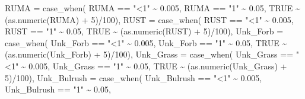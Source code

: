 \documentclass[
]{book}
\newenvironment{Shaded}{\begin{snugshade}}{\end{snugshade}}
\newcommand{\AttributeTok}[1]{\textcolor[rgb]{0.77,0.63,0.00}{#1}}
\newcommand{\ConstantTok}[1]{\textcolor[rgb]{0.00,0.00,0.00}{#1}}
\newcommand{\DecValTok}[1]{\textcolor[rgb]{0.00,0.00,0.81}{#1}}
\newcommand{\FloatTok}[1]{\textcolor[rgb]{0.00,0.00,0.81}{#1}}
\newcommand{\FunctionTok}[1]{\textcolor[rgb]{0.00,0.00,0.00}{#1}}
\newcommand{\NormalTok}[1]{#1}
\newcommand{\SpecialCharTok}[1]{\textcolor[rgb]{0.00,0.00,0.00}{#1}}
\newcommand{\StringTok}[1]{\textcolor[rgb]{0.31,0.60,0.02}{#1}}
\begin{document}
\begin{Shaded}
\begin{Highlighting}[]
        \AttributeTok{RUMA =} \FunctionTok{case\_when}\NormalTok{(}
\NormalTok{          RUMA }\SpecialCharTok{==} \StringTok{"\textless{}1"} \SpecialCharTok{\textasciitilde{}} \FloatTok{0.005}\NormalTok{, }
\NormalTok{          RUMA }\SpecialCharTok{==} \StringTok{"1"} \SpecialCharTok{\textasciitilde{}} \FloatTok{0.05}\NormalTok{, }
          \ConstantTok{TRUE} \SpecialCharTok{\textasciitilde{}}\NormalTok{ (}\FunctionTok{as.numeric}\NormalTok{(RUMA) }\SpecialCharTok{+} \DecValTok{5}\NormalTok{)}\SpecialCharTok{/}\DecValTok{100}\NormalTok{),}
        \AttributeTok{RUST =} \FunctionTok{case\_when}\NormalTok{(}
\NormalTok{          RUST }\SpecialCharTok{==} \StringTok{"\textless{}1"} \SpecialCharTok{\textasciitilde{}} \FloatTok{0.005}\NormalTok{, }
\NormalTok{          RUST }\SpecialCharTok{==} \StringTok{"1"} \SpecialCharTok{\textasciitilde{}} \FloatTok{0.05}\NormalTok{, }
          \ConstantTok{TRUE} \SpecialCharTok{\textasciitilde{}}\NormalTok{ (}\FunctionTok{as.numeric}\NormalTok{(RUST) }\SpecialCharTok{+} \DecValTok{5}\NormalTok{)}\SpecialCharTok{/}\DecValTok{100}\NormalTok{),}
        \AttributeTok{Unk\_Forb =} \FunctionTok{case\_when}\NormalTok{(}
\NormalTok{          Unk\_Forb }\SpecialCharTok{==} \StringTok{"\textless{}1"} \SpecialCharTok{\textasciitilde{}} \FloatTok{0.005}\NormalTok{, }
\NormalTok{          Unk\_Forb }\SpecialCharTok{==} \StringTok{"1"} \SpecialCharTok{\textasciitilde{}} \FloatTok{0.05}\NormalTok{, }
          \ConstantTok{TRUE} \SpecialCharTok{\textasciitilde{}}\NormalTok{ (}\FunctionTok{as.numeric}\NormalTok{(Unk\_Forb) }\SpecialCharTok{+} \DecValTok{5}\NormalTok{)}\SpecialCharTok{/}\DecValTok{100}\NormalTok{),}
        \AttributeTok{Unk\_Grass =} \FunctionTok{case\_when}\NormalTok{(}
\NormalTok{          Unk\_Grass }\SpecialCharTok{==} \StringTok{"\textless{}1"} \SpecialCharTok{\textasciitilde{}} \FloatTok{0.005}\NormalTok{, }
\NormalTok{          Unk\_Grass }\SpecialCharTok{==} \StringTok{"1"} \SpecialCharTok{\textasciitilde{}} \FloatTok{0.05}\NormalTok{, }
          \ConstantTok{TRUE} \SpecialCharTok{\textasciitilde{}}\NormalTok{ (}\FunctionTok{as.numeric}\NormalTok{(Unk\_Grass) }\SpecialCharTok{+} \DecValTok{5}\NormalTok{)}\SpecialCharTok{/}\DecValTok{100}\NormalTok{),}
        \AttributeTok{Unk\_Bulrush =} \FunctionTok{case\_when}\NormalTok{(}
\NormalTok{          Unk\_Bulrush }\SpecialCharTok{==} \StringTok{"\textless{}1"} \SpecialCharTok{\textasciitilde{}} \FloatTok{0.005}\NormalTok{, }
\NormalTok{          Unk\_Bulrush }\SpecialCharTok{==} \StringTok{"1"} \SpecialCharTok{\textasciitilde{}} \FloatTok{0.05}\NormalTok{, }

\end{Highlighting}
\end{Shaded}
\end{document}
